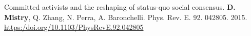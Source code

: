 \begin{cventries}
  \cvpublicationentrytwo
    {Committed activists and the reshaping of status-quo social consensus.} %
    {\textbf{D. Mistry}, Q. Zhang, N. Perra, A. Baronchelli.} %
    {Phys. Rev. E.} %
    { 92.} %
    { } %
    {042805. } %
    { 2015.} %
    {} %
    {\href{https:/doi.org/10.1103/PhysRevE.92.042805}{https:/doi.org/10.1103/PhysRevE.92.042805 \faLink\acvHeaderIconSep}} %
    \vspace{.5mm}

\end{cventries}